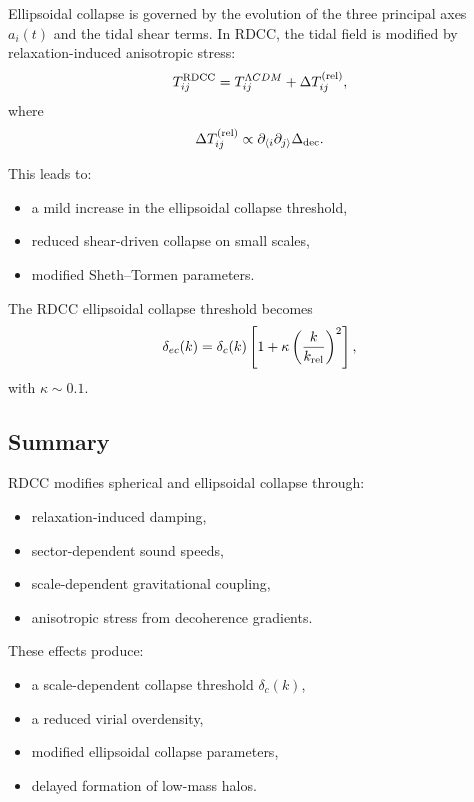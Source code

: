\documentclass[11pt,a4paper]{article}
\begin{document}
Ellipsoidal collapse is governed by the evolution of the three principal axes $a_i(t)$ and the
tidal shear terms. In RDCC, the tidal field is modified by relaxation-induced anisotropic stress:
\begin{equation}
T_{ij}^{\rm RDCC}
= T_{ij}^{\Lambda CDM}
+ \Delta T_{ij}^{\rm (rel)},
\end{equation}
where
\begin{equation}
\Delta T_{ij}^{\rm (rel)}
\propto \partial_{\langle i}\partial_{j\rangle}\Delta_{\rm dec}.
\end{equation}

This leads to:
\begin{itemize}
\item a mild increase in the ellipsoidal collapse threshold,
\item reduced shear-driven collapse on small scales,
\item modified Sheth–Tormen parameters.
\end{itemize}

The RDCC ellipsoidal collapse threshold becomes
\begin{equation}
\delta_{ec}(k)
= \delta_c(k)
\left[
1 + \kappa\left(\frac{k}{k_{\rm rel}}\right)^2
\right],
\end{equation}
with $\kappa \sim 0.1$.

\subsection{Summary}

RDCC modifies spherical and ellipsoidal collapse through:
\begin{itemize}
\item relaxation-induced damping,
\item sector-dependent sound speeds,
\item scale-dependent gravitational coupling,
\item anisotropic stress from decoherence gradients.
\end{itemize}

These effects produce:
\begin{itemize}
\item a scale-dependent collapse threshold $\delta_c(k)$,
\item a reduced virial overdensity,
\item modified ellipsoidal collapse parameters,
\item delayed formation of low-mass halos.
\end{itemize}
\end{document}
